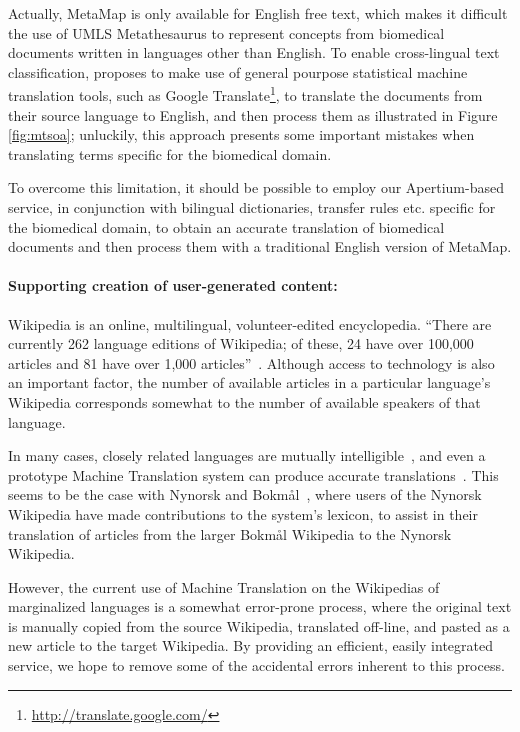 \documentclass[11pt]{article}
\begin{document}
Actually, MetaMap is only available for English free text, which makes it difficult the use of UMLS Metathesaurus to represent concepts from biomedical documents written in languages other than English. To enable cross-lingual text classification, \cite{metamapes} proposes to make use of general pourpose statistical machine translation tools, such as Google Translate\footnote{\small\url{http://translate.google.com/}}, to translate the documents from their source language to English, and then process them as illustrated in Figure \ref{fig:mtsoa}; unluckily, this approach presents some important mistakes when translating terms specific for the biomedical domain.

To overcome this limitation, it should be possible to employ our Apertium-based service, in conjunction with bilingual dictionaries, transfer rules etc. specific for the biomedical domain, to obtain an accurate translation of biomedical documents and then process them with a traditional English version of MetaMap.


\paragraph{Supporting creation of user-generated content:} Wikipedia is an online, multilingual, volunteer-edited encyclopedia. ``There are currently 262 language editions of Wikipedia; of these, 24 have over 100,000 articles and 81 have over 1,000 articles''~\citep{wikipedia}. Although access to technology is also an important factor, the number of available articles in a particular language's Wikipedia corresponds somewhat to the number of available speakers of that language.

In many cases, closely related languages are mutually intelligible~\citep{tyers09a}, and even a prototype Machine Translation system can produce accurate translations~\citep{oller06}. This seems to be the case with Nynorsk and Bokmål~\citep{unhammer09}, where users of the Nynorsk Wikipedia have made contributions to the system's lexicon, to assist in their translation of articles from the larger Bokmål Wikipedia to the Nynorsk Wikipedia.

However, the current use of Machine Translation on the Wikipedias of marginalized languages is a somewhat error-prone process, where the original text is manually copied from the source Wikipedia, translated off-line, and pasted as a new article to the target Wikipedia. By providing an efficient, easily integrated service, we hope to remove some of the accidental errors inherent to this process.
\end{document}
